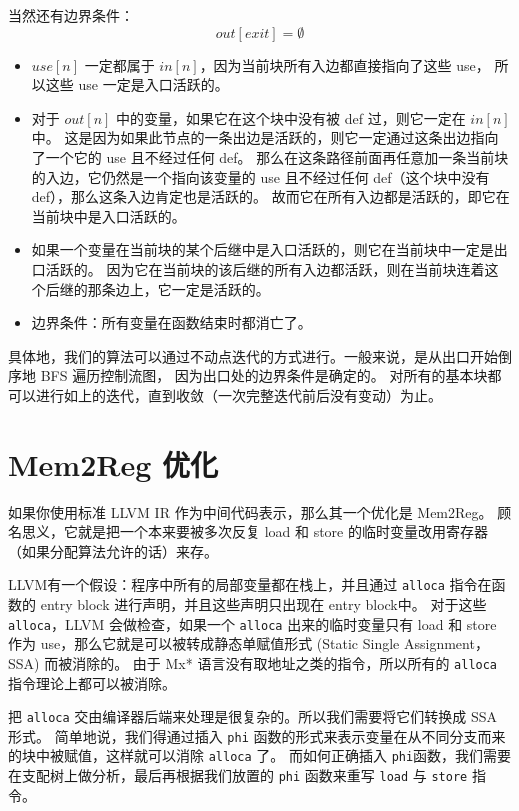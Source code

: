 当然还有边界条件：
$$
out[exit] = \emptyset
$$

\begin{itemize}
\item $use[n]$ 一定都属于 $in[n]$，因为当前块所有入边都直接指向了这些 use，
所以这些 use 一定是入口活跃的。

\item 对于 $out[n]$ 中的变量，如果它在这个块中没有被 def 过，则它一定在 $in[n]$ 中。
这是因为如果此节点的一条出边是活跃的，则它一定通过这条出边指向了一个它的 use 且不经过任何 def。
那么在这条路径前面再任意加一条当前块的入边，它仍然是一个指向该变量的 use 且不经过任何
def（这个块中没有 def），那么这条入边肯定也是活跃的。
故而它在所有入边都是活跃的，即它在当前块中是入口活跃的。

\item 如果一个变量在当前块的某个后继中是入口活跃的，则它在当前块中一定是出口活跃的。
因为它在当前块的该后继的所有入边都活跃，则在当前块连着这个后继的那条边上，它一定是活跃的。

\item 边界条件：所有变量在函数结束时都消亡了。
\end{itemize}

具体地，我们的算法可以通过不动点迭代的方式进行。一般来说，是从出口开始倒序地 BFS 遍历控制流图，
因为出口处的边界条件是确定的。
对所有的基本块都可以进行如上的迭代，直到收敛（一次完整迭代前后没有变动）为止。

\section{Mem2Reg 优化}\label{mem2reg}

如果你使用标准 LLVM IR 作为中间代码表示，那么其一个优化是 Mem2Reg。
顾名思义，它就是把一个本来要被多次反复 load 和 store 的临时变量改用寄存器（如果分配算法允许的话）来存。

LLVM有一个假设：程序中所有的局部变量都在栈上，并且通过 \texttt{alloca} 指令在函数的 entry block
进行声明，并且这些声明只出现在 entry block中。
对于这些 \texttt{alloca}，LLVM 会做检查，如果一个 \texttt{alloca} 出来的临时变量只有
load 和 store 作为 use，那么它就是可以被转成静态单赋值形式 (Static Single Assignment，SSA) 而被消除的。
由于 Mx* 语言没有取地址之类的指令，所以所有的 \texttt{alloca} 指令理论上都可以被消除。

把 \texttt{alloca} 交由编译器后端来处理是很复杂的。所以我们需要将它们转换成 SSA 形式。
简单地说，我们得通过插入 \texttt{phi} 函数的形式来表示变量在从不同分支而来的块中被赋值，这样就可以消除
\texttt{alloca} 了。
而如何正确插入 \texttt{phi}函数，我们需要在支配树上做分析，最后再根据我们放置的
\texttt{phi} 函数来重写 \texttt{load} 与 \texttt{store} 指令。

